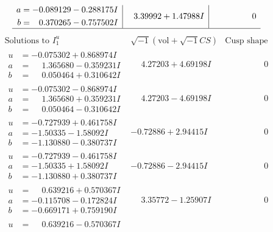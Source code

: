 \documentclass[1p]{elsarticle_modified}
\theoremstyle{definition}
\newcommand{\I}{\sqrt{-1}}
\begin{document}
$$\begin{array}{c|c|c}
\begin{aligned}
a &= -0.089129 - 0.288175 I \\
b &= \phantom{-}0.370265 - 0.757502 I\end{aligned}
 & \phantom{-}3.39992 + 1.47988 I & \phantom{-0.000000 } 0\\
 \hline 
 \end{array}$$\newpage$$\begin{array}{c|c|c}  
\text{Solutions to }I^u_{1}& \I (\text{vol} + \sqrt{-1}CS) & \text{Cusp shape}\\
 \hline 
\begin{aligned}
u &= -0.075302 + 0.868974 I \\
a &= \phantom{-}1.365680 - 0.359231 I \\
b &= \phantom{-}0.050464 + 0.310642 I\end{aligned}
 & \phantom{-}4.27203 + 4.69198 I & \phantom{-0.000000 } 0 \\ \hline\begin{aligned}
u &= -0.075302 - 0.868974 I \\
a &= \phantom{-}1.365680 + 0.359231 I \\
b &= \phantom{-}0.050464 - 0.310642 I\end{aligned}
 & \phantom{-}4.27203 - 4.69198 I & \phantom{-0.000000 } 0 \\ \hline\begin{aligned}
u &= -0.727939 + 0.461758 I \\
a &= -1.50335 - 1.58092 I \\
b &= -1.130880 - 0.380737 I\end{aligned}
 & -0.72886 + 2.94415 I & \phantom{-0.000000 } 0 \\ \hline\begin{aligned}
u &= -0.727939 - 0.461758 I \\
a &= -1.50335 + 1.58092 I \\
b &= -1.130880 + 0.380737 I\end{aligned}
 & -0.72886 - 2.94415 I & \phantom{-0.000000 } 0 \\ \hline\begin{aligned}
u &= \phantom{-}0.639216 + 0.570367 I \\
a &= -0.115708 - 0.172824 I \\
b &= -0.669171 + 0.759190 I\end{aligned}
 & \phantom{-}3.35772 - 1.25907 I & \phantom{-0.000000 } 0 \\ \hline\begin{aligned}
u &= \phantom{-}0.639216 - 0.570367 I \\

\end{aligned}
\end{array}$$
\end{document}
